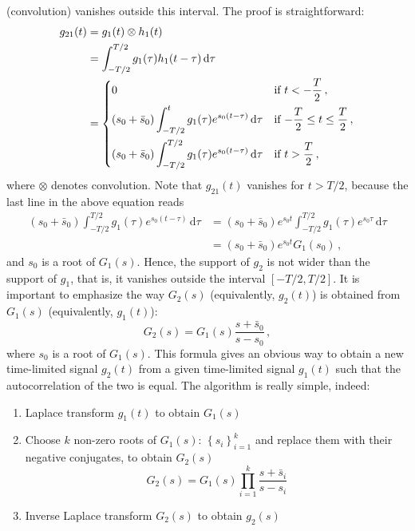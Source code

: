 (convolution) vanishes outside this interval. The proof is
straightforward:
\begin{align}
  g_{21}(t)
  & = g_{1}(t)\otimes h_{1}(t)\\
  & = \int_{-T/2}^{T/2}g_{1}(\tau)h_{1}(t-\tau)\,\mathrm{d}\tau\\
  & =
  \begin{dcases}
    0 & \text{if $t < - \frac{T}{2}$}\,, \\
    (s_{0}+\bar s_{0}) \int_{-T/2}^{t}
    g_{1}(\tau)e^{s_{0}(t-\tau)}\,\mathrm{d}\tau & \text{if $-\frac{T}{2}\leq t
    \leq \frac{T}{2}$}\,,  \\
    (s_{0}+\bar s_{0})\int_{-T/2}^{T/2}
    g_{1}(\tau)e^{s_{0}(t-\tau)}\,\mathrm{d}\tau &  \text{if $t >
      \frac{T}{2}$}\,, 
  \end{dcases}
\end{align}
where $\otimes$ denotes convolution.
Note that $g_{21}(t)$ vanishes for $t > T/2$, because the last line in
the above equation reads
\begin{equation}
  \begin{split}
    (s_{0}+\bar s_{0})\int_{-T/2}^{T/2}
    g_{1}(\tau)e^{s_{0}(t-\tau)}\,\mathrm{d}\tau
    & =   (s_{0}+\bar s_{0}) e^{s_{0}t}\int_{-T/2}^{T/2}
    g_{1}(\tau)e^{s_{0}\tau}\,\mathrm{d}\tau \\
    & = (s_{0}+\bar s_{0}) e^{s_{0}t} G_{1}(s_{0}) \,, 
  \end{split}
\end{equation}
and $s_{0}$ is a root of $G_{1}(s)$. Hence, the support of $g_{2}$ is
not wider than the support of $g_{1}$,
that is, it vanishes outside the interval $[-T/2, T/2]$. It is important
to emphasize the way $G_{2}(s)$ (equivalently,  $g_{2}(t)$) is
obtained from $G_{1}(s)$ (equivalently,  $g_{1}(t)$):
\begin{equation}
  \label{eq:25}
  G_{2}(s) = G_{1}(s)\frac{s+\bar s_{0}}{s-s_{0}}\,,
\end{equation}
where $s_{0}$ is a root of $G_{1}(s)$. This formula gives an obvious
way to obtain a new time-limited signal $g_{2}(t)$ from a given
time-limited signal $g_{1}(t)$ such that the autocorrelation of the
two is equal. The algorithm is really simple, indeed:
\begin{enumerate}
\item Laplace transform $g_{1}(t)$ to obtain $G_{1}(s)$
\item Choose $k$ non-zero roots of $G_{1}(s)$:
  $\left\{s_{i}\right\}_{i=1}^{k}$ and replace them with their
  negative conjugates, to obtain $G_{2}(s)$
  \begin{equation}
    \label{eq:26}
     G_{2}(s)=G_{1}(s)\prod_{i=1}^{k}\frac{s+\bar s_{i}}{s-s_{i}}
  \end{equation}
\item Inverse Laplace transform $G_{2}(s)$ to obtain $g_{2}(s)$
\end{enumerate}
